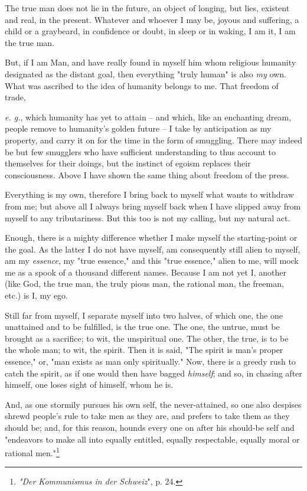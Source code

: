 The true man does not lie in the future, an object of longing, but lies, 
existent and real, in the present. Whatever and whoever I may be, joyous and 
suffering, a child or a graybeard, in confidence or doubt, in sleep or in 
waking, I am it, I am the true man.

But, if I am Man, and have really found in myself him whom religious humanity 
designated as the distant goal, then everything "{}truly human"{} is also 
\textit{my} own. What was ascribed to the idea of humanity belongs to me. That 
freedom of trade,

\textit{e. g.}, which humanity has yet to attain -- and which, like an 
enchanting dream, people remove to humanity's golden future -- I take by 
anticipation as my property, and carry it on for the time in the form of 
smuggling. There may indeed be but few smugglers who have sufficient 
understanding to thus account to themselves for their doings, but the instinct 
of egoism replaces their consciousness. Above I have shown the same thing 
about freedom of the press.

Everything is my own, therefore I bring back to myself what wants to withdraw 
from me; but above all I always bring myself back when I have slipped away 
from myself to any tributariness. But this too is not my calling, but my 
natural act.

Enough, there is a mighty difference whether I make myself the starting-point 
or the goal. As the latter I do not have myself, am consequently still alien 
to myself, am my \textit{essence}, my "{}true essence,"{} and this "{}true 
essence,"{} alien to me, will mock me as a spook of a thousand different 
names. Because I am not yet I, another (like God, the true man, the truly 
pious man, the rational man, the freeman, etc.) is I, my ego.

Still far from myself, I separate myself into two halves, of which one, the 
one unattained and to be fulfilled, is the true one. The one, the untrue, must 
be brought as a sacrifice; to wit, the unspiritual one. The other, the true, 
is to be the whole man; to wit, the spirit. Then it is said, "{}The spirit is 
man's proper essence,"{} or, "{}man exists as man only spiritually."{} Now, 
there is a greedy rush to catch the spirit, as if one would then have bagged 
\textit{himself}; and so, in chasing after himself, one loses sight of 
himself, whom he is.

And, as one stormily pursues his own self, the never-attained, so one also 
despises shrewd people's rule to take men as they are, and prefers to take 
them as they should be; and, for this reason, hounds every one on after his 
should-be self and "{}endeavors to make all into equally entitled, equally 
respectable, equally moral or rational men."{}\footnote{\textit{"{}Der 
Kommunismus in der Schweiz}"{}, p. 24.}

